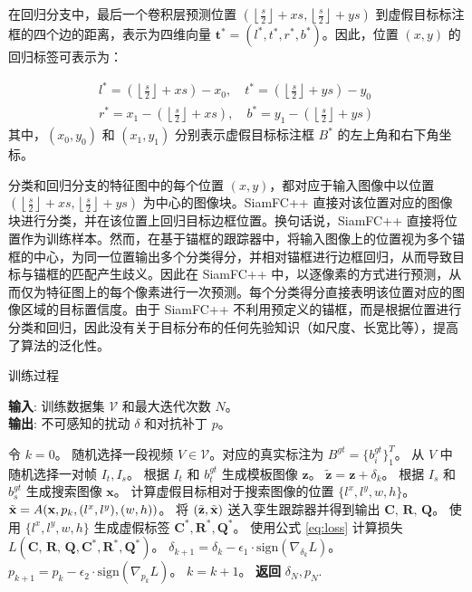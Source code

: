 在回归分支中，最后一个卷积层预测位置 $\left(\left\lfloor\frac{s}{2}\right\rfloor+x s,\left\lfloor\frac{s}{2}\right\rfloor+y s\right)$ 到虚假目标标注框的四个边的距离，表示为四维向量 $\boldsymbol{t}^{*}=\left(l^{*}, t^{*}, r^{*}, b^{*}\right)$。因此，位置 $(x,y)$ 的回归标签可表示为：

\begin{equation}
\begin{array}{ll}
l^{*}=\left(\left\lfloor\frac{s}{2}\right\rfloor+x s\right)-x_{0}, \quad t^{*}=\left(\left\lfloor\frac{s}{2}\right\rfloor+y s\right)-y_{0} \\
r^{*}=x_{1}-\left(\left\lfloor\frac{s}{2}\right\rfloor+x s\right), \quad b^{*}=y_{1}-\left(\left\lfloor\frac{s}{2}\right\rfloor+y s\right)
\end{array}
\end{equation}
其中，$(x_0, y_0)$ 和 $(x_1, y_1)$ 分别表示虚假目标标注框 $B^*$ 的左上角和右下角坐标。

分类和回归分支的特征图中的每个位置 $(x,y)$，都对应于输入图像中以位置 $\left(\left\lfloor\frac{s}{2}\right\rfloor+x s,\left\lfloor\frac{s}{2}\right\rfloor+y s\right)$ 为中心的图像块。SiamFC++ \cite{SiamFC++} 直接对该位置对应的图像块进行分类，并在该位置上回归目标边框位置。换句话说，SiamFC++ 直接将位置作为训练样本。然而，在基于锚框的跟踪器中，将输入图像上的位置视为多个锚框的中心，为同一位置输出多个分类得分，并相对锚框进行边框回归，从而导致目标与锚框的匹配产生歧义。因此在 SiamFC++ 中，以逐像素的方式进行预测，从而仅为特征图上的每个像素进行一次预测。每个分类得分直接表明该位置对应的图像区域的目标置信度。由于 SiamFC++ 不利用预定义的锚框，而是根据位置进行分类和回归，因此没有关于目标分布的任何先验知识（如尺度、长宽比等），提高了算法的泛化性。

\begin{algorithm}[tb]
\caption{训练过程}
\label{alg:algorithm}
\textbf{输入}: 训练数据集 $\mathcal{V}$ 和最大迭代次数 $N$。\\
\textbf{输出}: 不可感知的扰动 $\delta$ 和对抗补丁 $p$。
\begin{algorithmic}[1] %
\State 令 $k = 0$。
\State 随机选择一段视频 $V\in \mathcal{V}$。对应的真实标注为 $B^{gt}=\{b^{gt}_i\}^T_1$。
\State 从 $V$ 中随机选择一对帧 $I_t, I_s$。
\State 根据 $I_t$ 和 $b^{gt}_t$ 生成模板图像 $\textbf{z}$。
\State $\tilde{\textbf{z}} = \textbf{z} + \delta_k$。
\State 根据 $I_s$ 和 $b^{gt}_s$ 生成搜索图像 $\textbf{x}$。
\State 计算虚假目标相对于搜索图像的位置 $\{l^x, l^y, w, h\}$。
\State $\tilde{\textbf x} = A(\textbf x, p_k, (l^x, l^y), (w, h))$。
\State 将 $(\tilde{\textbf{z}}, \tilde{\textbf x})$ 送入孪生跟踪器并得到输出 $\textbf{C, R, Q}$。
\State 使用 $\{l^x, l^y, w, h\}$ 生成虚假标签 $\textbf{C}^*,\textbf{R}^*,\textbf{Q}^*$。
\State 使用公式 \ref{eq:loss} 计算损失 $L(\textbf{C, R, Q}, \textbf{C}^*, \textbf{R}^*, \textbf{Q}^*)$。
\State $\delta_{k+1} = \delta_{k} - \epsilon_1 \cdot \text{sign}(\nabla_{\delta_k}L)$。
\State $p_{k+1} = p_{k} - \epsilon_2 \cdot \text{sign}(\nabla_{p_k}L)$。
\State $k = k + 1$。
\EndWhile
\State \textbf{返回} $\delta_N, p_N.$
\end{algorithmic}
\label{attack_alg}
\end{algorithm}

